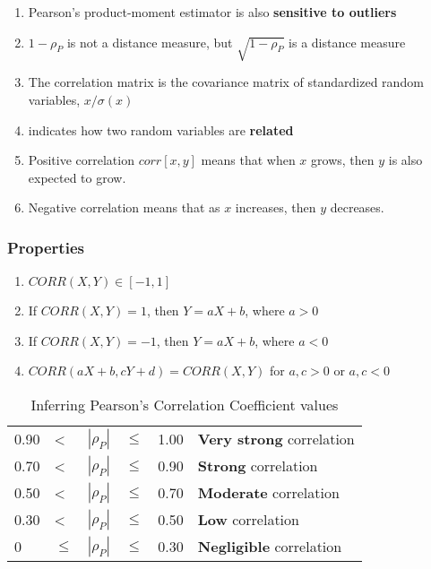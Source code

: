 \begin{enumerate}
    \item Pearson’s product-moment estimator is also \textbf{sensitive to outliers}

    \item $1-\rho_P$ is not a distance measure, but $\sqrt{1-\rho_P}$ is a distance measure

    \item The correlation matrix is the covariance matrix of standardized random variables, $x/\sigma(x)$

    \item indicates how two random variables are \textbf{related}

    \item Positive correlation $corr[x, y]$ means that when $x$ grows, then $y$ is also expected to grow. 

    \item Negative correlation means that as $x$ increases, then $y$ decreases.

\end{enumerate}

\subsubsection*{Properties \cite{ism-1}}

\begin{enumerate}
    \item $CORR(X, Y) \in [-1, 1]$

    \item If $CORR(X, Y) = 1$, then $Y = aX + b$, where $a > 0$

    \item If $CORR(X, Y) = -1$, then $Y = aX + b$, where $a < 0$

    \item $CORR(aX + b, cY + d) = CORR(X, Y)$  for $a, c > 0$ or $a, c < 0$

    
\end{enumerate}

\begin{table}[H]
    \centering
    \begin{tabular}{l l l l l l} 
        0.90 & < & $|\rho_P|$ & $\leq$ & 1.00 & \textbf{Very strong} correlation\\
        0.70 & < & $|\rho_P|$ & $\leq$ & 0.90  & \textbf{Strong} correlation\\
        0.50 & < & $|\rho_P|$ & $\leq$ & 0.70 &  \textbf{Moderate} correlation\\
        0.30 & < & $|\rho_P|$ & $\leq$ & 0.50  & \textbf{Low} correlation\\
        0  &  $\leq$ & $|\rho_P|$ & $\leq$ & 0.30 &  \textbf{Negligible} correlation\\
    \end{tabular}
    \caption{Inferring Pearson’s Correlation Coefficient values \cite{ism-1}}
\end{table}


